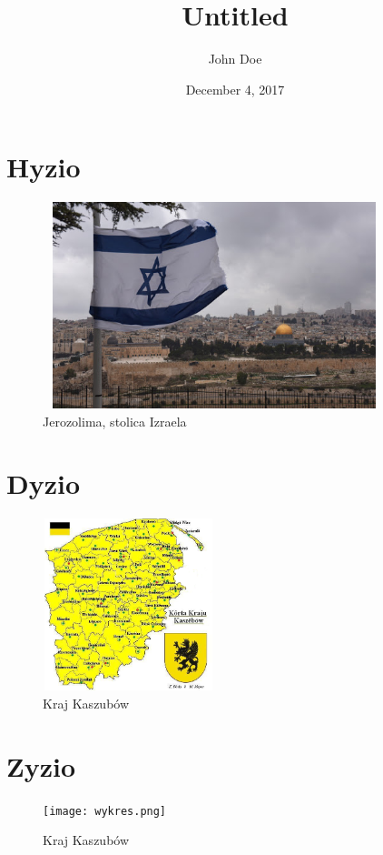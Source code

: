 \documentclass[a4paper,12pt]{article}
\author{John Doe}
\title{Untitled}
\date{December 4, 2017} %
\begin{document}
	\section{Hyzio}
    \blindtext
	\begin{figure}[h!]
		\centering
		\label{jerozolima1}
		\includegraphics[width=10cm,height=6cm]{obrazek1.jpg}
		\caption{Jerozolima, stolica Izraela}
	\end{figure}    
    
    \section{Dyzio}
    \blindtext
	\begin{figure}[h!]
		\centering
		\includegraphics[width=5cm,height=5cm]{obrazek2.jpg}
		\caption{Kraj Kaszubów}
	\end{figure}      
    
    \section{Zyzio}
    \blindtext
    \begin{figure}[h!]
		\centering
		\texttt{[image: wykres.png]}
		\caption{Kraj Kaszubów}
	\end{figure}  
\end{document}
